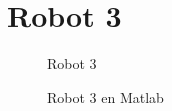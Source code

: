 \section{Robot 3}



\begin{figure}
	\centering
	\caption{Robot 3}
	\label{fig:robot3}
\end{figure}


\begin{figure}
	\centering
	\caption{Robot 3 en Matlab}
	\label{fig:robot_3}
\end{figure}
